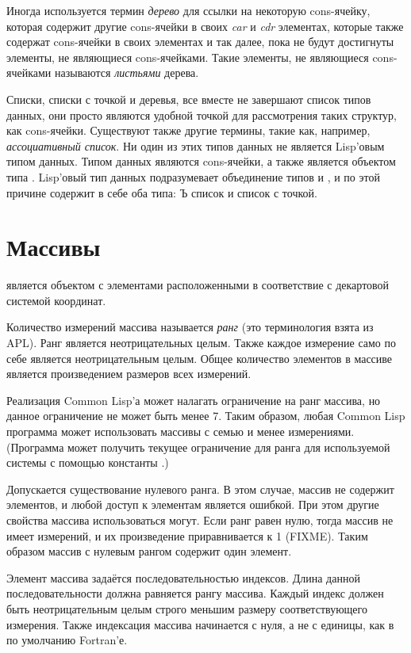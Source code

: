 Иногда используется термин \emph{дерево} для ссылки на некоторую cons-ячейку,
которая содержит другие cons-ячейки в своих \emph{car} и \emph{cdr} элементах,
которые также содержат cons-ячейки в своих элементах и так далее, пока не будут
достигнуты элементы, не являющиеся cons-ячейками.
Такие элементы, не являющиеся cons-ячейками называются \emph{листьями} дерева.

Списки, списки с точкой и деревья, все вместе не завершают список типов данных,
они просто являются удобной точкой для рассмотрения таких структур, как
cons-ячейки.
Существуют также другие термины, такие как, например, \emph{ассоциативный
  список}. Ни один из этих типов данных не является Lisp'овым типом
данных. Типом данных являются cons-ячейки, а также {\nil} является объектом типа
. Lisp'овый тип данных  подразумевает объединение типов
 и , и по этой причине содержит в себе оба типа: Ъ
список и список с точкой.

\section{Массивы}
\label{ARRAY-TYPE-SECTION}

 является объектом с элементами расположенными в соответствие с
декартовой системой координат.

Количество измерений массива называется \emph{ранг} (это терминология взята из
APL). Ранг является неотрицательных целым.
Также каждое измерение само по себе является неотрицательным целым.
Общее количество элементов в массиве является произведением размеров всех
измерений.

Реализация Common Lisp'а может налагать ограничение на ранг массива, но данное
ограничение не может быть менее 7. Таким образом, любая Common Lisp программа
может использовать массивы с семью и менее измерениями.
(Программа может получить текущее ограничение для ранга для используемой системы
с помощью константы .)

Допускается существование нулевого ранга. В этом случае, массив не содержит
элементов, и любой доступ к элементам является ошибкой. При этом другие
свойства массива использоваться могут. Если ранг равен нулю, тогда массив не
имеет измерений, и их произведение приравнивается к 1 (FIXME).
Таким образом массив с нулевым рангом содержит один элемент.

Элемент массива задаётся последовательностью индексов.
Длина данной последовательности должна равняется рангу массива.
Каждый индекс должен быть неотрицательным целым строго меньшим размеру
соответствующего измерения. Также индексация массива начинается с нуля, а не с
единицы, как в по умолчанию Fortran'е.


